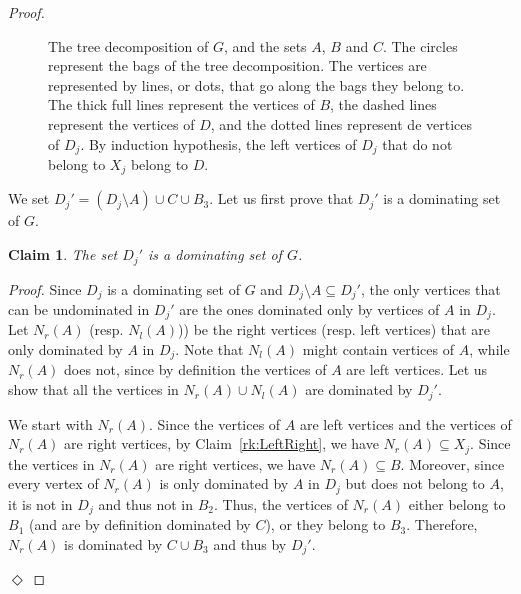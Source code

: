 \documentclass[10pt]{article}
\newtheorem{claim}{Claim}
\newenvironment{proofclaim}[1][]%
    {\noindent \emph{Proof.} {}{#1}{}}{\hfill
    $\Diamond$\vspace{1em}}
\begin{document}
\begin{proof}
\begin{figure}[bt]
{}
    \caption{The tree decomposition of $G$, and the sets $A$, $B$ and $C$. The circles represent the bags of the tree decomposition. The vertices are represented by lines, or dots, that go along the bags they belong to. The thick full lines represent the vertices of $B$, the dashed lines represent the vertices of $D$, and the dotted lines represent de vertices of $D_j$. By induction hypothesis, the left vertices of $D_j$ that do not belong to $X_j$ belong to $D$. }
	\label{fig:tw}
\end{figure}

We set $D_j'=(D_j\setminus A)\cup C \cup B_3$. Let us first prove that $D_j'$ is a dominating set of $G$.

\begin{claim}\label{cl:Dr'}
The set $D_j'$ is a dominating set of $G$.
\end{claim}

\begin{proofclaim}
Since $D_j$ is a dominating set of $G$ and $D_j \setminus A \subseteq D_j'$, the only vertices that can be undominated in $D_j'$ are the ones dominated only by vertices of $A$ in $D_j$. Let $N_r(A)$ (resp. $N_l(A)$)) be the right vertices (resp. left vertices) that are only dominated by $A$ in $D_j$. Note that $N_l(A)$ might contain vertices of $A$, while $N_r(A)$ does not, since by definition the vertices of $A$ are left vertices. Let us show that all the vertices in $N_r(A) \cup N_l(A)$ are dominated by $D_j'$.

We start with $N_r(A)$. Since the vertices of $A$ are left vertices and the vertices of $N_r(A)$ are right vertices, by Claim~\ref{rk:LeftRight}, we have $N_r(A)\subseteq X_j$. Since the vertices in $N_r(A)$ are right vertices, we have $N_r(A)\subseteq B$. Moreover, since every vertex of $N_r(A)$ is only dominated by $A$ in $D_j$ but does not belong to $A$, it is not in $D_j$ and thus not in $B_2$. Thus, the vertices of $N_r(A)$ either belong to $B_1$ (and are by definition dominated by $C$), or they belong to $B_3$. Therefore, $N_r(A)$ is dominated by $C \cup B_3$ and thus by $D_j'$.


\end{proofclaim}
\end{proof}
\end{document}
